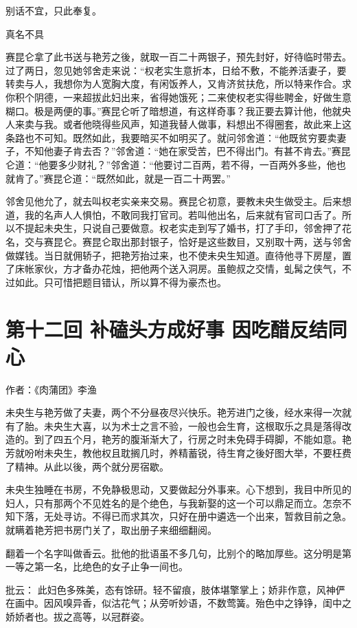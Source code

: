\documentclass[a4paper,12pt,UTF8,twoside]{ctexbook}
\begin{document}
别话不宜，只此奉复。

真名不具

赛昆仑拿了此书送与艳芳之後，就取一百二十两银子，预先封好，好待临时带去。过了两日，忽见她邻舍走来说：“权老实生意折本，日给不敷，不能养活妻子，要转卖与人，我想你为人宽胸大度，有闲饭养人，又肯济贫扶危，所以特来作合。求你积个阴德，一来超拔此妇出来，省得她饿死；二来使权老实得些聘金，好做生意糊口。极是两便的事。”赛昆仑听了暗想道，有这样奇事？我正要去算计他，他就央人来卖与我。或者他晓得些风声，知道我替人做事，料想出不得圈套，故此来上这条路也不可知。既然如此，我要暗买不如明买了。就问邻舍道：“他既贫穷要卖妻子，不知他妻子肯去否？”邻舍道：“她在家受苦，巴不得出门。有甚不肯去。”赛昆仑道：“他要多少财礼？”邻舍道：“他要讨二百两，若不得，一百两外多些，他也就肯了。”赛昆仑道：“既然如此，就是一百二十两罢。”

邻舍见他允了，就去叫权老实亲来交易。赛昆仑初意，要教未央生做受主。后来想道，我的名声人人惧怕，不敢同我打官司。若叫他出名，后来就有官司口舌了。所以不提起未央生，只说自己要做意。权老实走到写了婚书，打了手印，邻舍押了花名，交与赛昆仑。赛昆仑取出那封银子，恰好是这些数目，又别取十两，送与邻舍做媒钱。当日就佣轿子，把艳芳抬过来，也不使未央生知道。直待他寻下房屋，置了床帐家伙，方才备办花烛，把他两个送入洞房。虽鲍叔之交情，虬髯之侠气，不过如此。只可惜把题目错认，所以算不得为豪杰也。

\chapter{第十二回 补磕头方成好事 因吃醋反结同心}

作者：《肉蒲团》李渔

未央生与艳芳做了夫妻，两个不分昼夜尽兴快乐。艳芳进门之後，经水来得一次就有了胎。未央生大喜，以为术士之言不验，一般也会生育，这根取乐之具是落得改造的。到了四五个月，艳芳的腹渐渐大了，行房之时未免碍手碍脚，不能如意。艳芳就吩咐未央生，教他权且耽搁几时，养精蓄锐，待生育之後好图大举，不要枉费了精神。从此以後，两个就分房宿歇。

未央生独睡在书房，不免静极思动，又要做起分外事来。心下想到，我目中所见的妇人，只有那两个不见姓名的是个绝色，与我新娶的这一个可以鼎足而立。怎奈不知下落，无处寻访。不得已而求其次，只好在册中遴选一个出来，暂救目前之急。就瞒着艳芳把书房门关了，取出册子来细细翻阅。

翻着一个名字叫做香云。批他的批语虽不多几句，比别个的略加厚些。这分明是第一等之第一名，比绝色的女子止争一间也。

批云：
此妇色多殊美，态有馀研。轻不留痕，肢体堪擎掌上；娇非作意，风神俨在画中。因风嗅异香，似沽花气；从旁听妙语，不数莺簧。殆色中之铮铮，闺中之娇娇者也。拔之高等，以冠群姿。
\end{document}
